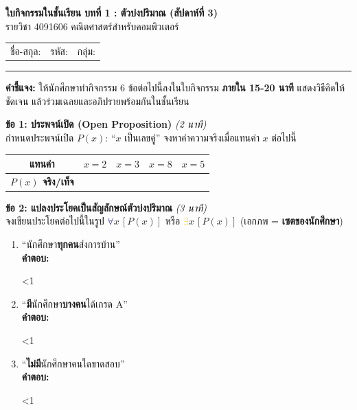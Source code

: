 \documentclass[a4paper,12pt]{article}
\newcounter{bl}
\newcommand{\blank}[1]{\par\vspace{0.2em}%
  \setcounter{bl}{0}\loop\ifnum\value{bl}<#1\relax
  \noindent\textcolor{gray!60}{\hrulefill}\par\vspace{1.0em}\stepcounter{bl}\repeat}
\newcommand{\A}{\textcolor{navy}{$\forall$}}
\newcommand{\E}{\textcolor{gold}{$\exists$}}
\begin{document}
\thispagestyle{empty}

\begin{center}
  {\Large\bfseries\color{navy} ใบกิจกรรมในชั้นเรียน บทที่ 1 : ตัวบ่งปริมาณ (สัปดาห์ที่ 3)}\\[0.2em]
  {\normalsize รายวิชา 4091606 คณิตศาสตร์สำหรับคอมพิวเตอร์}
\end{center}
\vspace{0.3em}
\noindent\begin{tabular}{@{}p{} p{} p{}@{}}
  ชื่อ-สกุล: \dotfill & รหัส: \dotfill & กลุ่ม: \dotfill
\end{tabular}
\hrule
\vspace{0.5em}
\noindent\textbf{คำชี้แจง:} ให้นักศึกษาทำกิจกรรม 6 ข้อต่อไปนี้ลงในใบกิจกรรม \textbf{ภายใน 15-20 นาที}
แสดงวิธีคิดให้ชัดเจน แล้วร่วมเฉลยและอภิปรายพร้อมกันในชั้นเรียน
\vspace{0.5em}

\noindent\textbf{ข้อ 1: ประพจน์เปิด (Open Proposition)} \hfill \textit{(2 นาที)} \\
กำหนดประพจน์เปิด $P(x)$: ``$x$ เป็นเลขคู่'' จงหาค่าความจริงเมื่อแทนค่า $x$ ต่อไปนี้
\begin{center}
\begin{tabular}{|c|c|c|c|c|}
  \hline
  \textbf{แทนค่า} & $x = 2$ & $x = 3$ & $x = 8$ & $x = 5$ \\ \hline
  \textbf{$P(x)$ จริง/เท็จ} & & & & \\ \hline
\end{tabular}
\end{center}

\noindent\textbf{ข้อ 2: แปลงประโยคเป็นสัญลักษณ์ตัวบ่งปริมาณ} \hfill \textit{(3 นาที)} \\
จงเขียนประโยคต่อไปนี้ในรูป \A$x\,[P(x)]$ หรือ \E$x\,[P(x)]$
\quad(เอกภพ = \textbf{เซตของนักศึกษา})
\begin{enumerate}[label=\arabic*)]
  \item ``นักศึกษา\textbf{ทุกคน}ส่งการบ้าน''\\
        \textbf{คำตอบ:} \blank{1}
  \item ``\textbf{มี}นักศึกษา\textbf{บางคน}ได้เกรด A''\\
        \textbf{คำตอบ:} \blank{1}
  \item ``\textbf{ไม่มี}นักศึกษาคนใดขาดสอบ''\\
        \textbf{คำตอบ:} \blank{1}
\end{enumerate}
\end{document}
